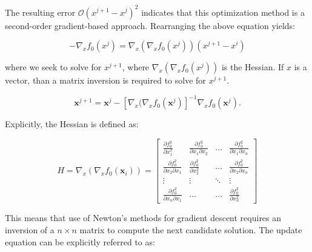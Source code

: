 The resulting error $\mathcal{O}(x^{j+1}-x^{j})^2$ indicates that this optimization method is a second-order gradient-based approach. Rearranging the above equation yields:

\begin{equation*}
    - \nabla_x f_0(x^j) = \nabla_x(\nabla_x f_0(x^j))(x^{j+1} - x^{i})
\end{equation*}

where we seek to solve for $x^{j+1}$, where $\nabla_x(\nabla_x f_0(x^j))$ is the Hessian. If $x$ is a vector, than a matrix inversion is required to solve for $x^{j+1}$. 

\begin{equation*}
    \boldsymbol{x}^{j+1} = \boldsymbol{x}^j - [\nabla_x(\nabla_x f_0(\boldsymbol{x}^j)]^{-1} \nabla_x f_0(\boldsymbol{x}^j).
\end{equation*}

Explicitly, the Hessian is defined as:

\begin{equation*}
    H = \nabla_x(\nabla_x f_0(\boldsymbol{x}_i)) = 
    \begin{bmatrix}
        \frac{\partial f_0^2}{\partial x_1^2} & \frac{\partial f_0^2}{\partial x_1 \partial x_2} & \ldots & \frac{\partial f_0^2}{\partial x_1 \partial x_n} \\
        \frac{\partial f_0^2}{\partial x_2 \partial x_1} & \frac{\partial f_0^2}{\partial x_2^2} & \ldots & \frac{\partial f_0^2}{\partial x_2 \partial x_n} \\
        \vdots & \vdots & \ddots & \vdots \\
        \frac{\partial f_0^2}{\partial x_n \partial x_1} & \ldots & \ldots & \frac{\partial f_0^2}{\partial x_n^2}
    \end{bmatrix}
\end{equation*}

This means that use of Newton's methods for gradient descent requires an inversion of a $n\times n$ matrix to compute the next candidate solution. The update equation can be explicitly referred to as:

